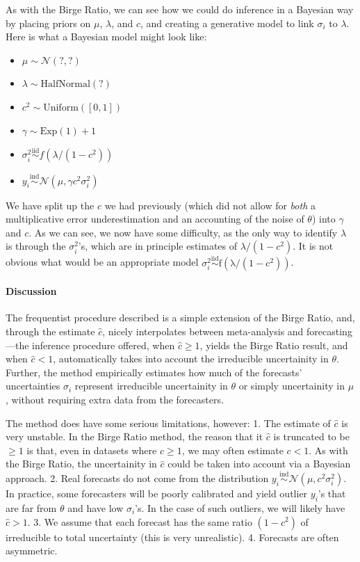 \documentclass[12pt]{article}
\begin{document}
As with the Birge Ratio, we can see how we could do inference in a Bayesian way by placing priors on $\mu$, $\lambda$, and $c$, and creating a generative model to link $\sigma_i$ to $\lambda$. Here is what a Bayesian model might look like:

\begin{itemize}

\item
  $\mu \sim \mathcal{N}(?,?)$
\item
  $\lambda\sim \mathrm{HalfNormal}(?)$
\item
  $c^2\sim\mathrm{Uniform}([0,1])$
\item
  $\gamma\sim\mathrm{Exp}(1)+1$
\item
  $\sigma_i^2\overset{\mathrm{iid}}{\sim}f(\lambda/(1-c^2))$
\item
  $y_i\overset{\mathrm{ind}}{\sim}\mathcal{N}(\mu,\gamma c^2\sigma_i^2)$
\end{itemize}

We have split up the $c$ we had previously (which did not allow for \emph{both} a multiplicative error underestimation and an accounting of the noise of $\theta$) into $\gamma$ and $c$. As we can see, we now have some difficulty, as the only way to identify $\lambda$ is through the $\sigma_i^2$'s, which are in principle estimates of $\lambda/(1-c^2)$. It is not obvious what would be an appropriate model $\sigma_i^2\overset{\mathrm{iid}}{\sim}\mathrm{f(\lambda/(1-c^2))}$.

\paragraph{Discussion}\label{discussion-1}

The frequentist procedure described is a simple extension of the Birge Ratio, and, through the estimate $\hat c$, nicely interpolates between meta-analysis and forecasting---the inference procedure offered, when $\hat c\geq1$, yields the Birge Ratio result, and when $\hat c<1$, automatically takes into account the irreducible uncertainity in $\theta$. Further, the method empirically estimates how much of the forecasts' uncertainties $\sigma_i$ represent irreducible uncertainity in $\theta$ or simply uncertainity in $\mu$, without requiring extra data from the forecasters.

The method does have some serious limitations, however:
1. The estimate of $\hat c$ is very unstable. In the Birge Ratio method, the reason that it $\hat c$ is truncated to be $\geq1$ is that, even in datasets where $c\geq 1$, we may often estimate $c<1$. As with the Birge Ratio, the uncertainity in $\hat c$ could be taken into account via a Bayesian approach.
2. Real forecasts do not come from the distribution $y_i\overset{\mathrm{ind}}{\sim}\mathcal{N}(\mu,c^2\sigma_i^2)$. In practice, some forecasters will be poorly calibrated and yield outlier $y_i$'s that are far from $\theta$ and have low $\sigma_i$'s. In the case of such outliers, we will likely have $\hat c>1$.
3. We assume that each forecast has the same ratio $(1-c^2)$ of irreducible to total uncertainty (this is very unrealistic).
4. Forecasts are often asymmetric.
\end{document}

